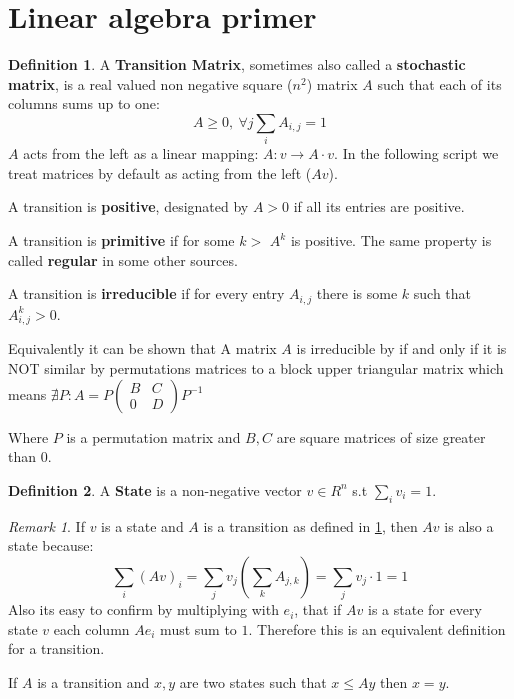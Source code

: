 \documentclass[a4paper,10pt]{article}
\theoremstyle{definition}
\newtheorem{mydef}{Definition}[section]
\theoremstyle{remark}
\newtheorem{remark}{Remark}
\theoremstyle{plain}
\begin{document}
\section{Linear algebra primer}

\begin{mydef}
\label{def:transition}
A \textbf{Transition Matrix}, sometimes also called
a \textbf{stochastic matrix}, is a real valued non negative square
($n^2$) matrix $A$ such that each of its
columns sums up to one: $$A \geq 0,\ \forall j \sum_i A_{i,j} = 1$$
$A$ acts from the left as a linear mapping:
$A:v \to A \cdot v$. In the following script we treat matrices by default
as acting from the left ($Av$). 

A transition is \textbf{positive}, designated by $A > 0$ if all its entries are positive.

A transition is \textbf{primitive} if for some $k>$ $A^k$ is positive. The same
property is called \textbf{regular} in some other sources.

A transition is \textbf{irreducible} if for every entry $A_{i,j}$ there is some $k$ such
that $A^k_{i,j} > 0$.

Equivalently it can be shown that 
A matrix $A$ is 
irreducible by if and only if it is NOT
similar by permutations matrices to a block upper triangular matrix
which means 
$
\nexists P : 
A =
P
\begin{pmatrix}
B & C \\
0 & D
\end{pmatrix}
P^{-1}
$

Where $P$ is a permutation matrix and $B, C$ are square matrices of size greater than $0$.
\end{mydef}

\begin{mydef}
\label{def:state}
A \textbf{State} is a non-negative vector $v \in R^n$ s.t $\sum_i v_i = 1$.
\end{mydef}

\begin{remark}
\label{remark:state}
If $v$ is a
state and $A$ is a transition as defined in
\ref{def:transition}, then
  $Av$ is also a state because: 
$$\sum_i(Av)_i = \sum_j v_j(\sum_k A_{j,k}) = \sum_j v_j \cdot 1 = 1$$
Also its easy to confirm by multiplying with $e_i$, that if $Av$ is a state
for every state $v$ 
each column $A e_i$ must sum to $1$.
Therefore this is an equivalent definition for a transition.

If $A$ is a transition and $x,y$ are two states such that
$x \leq Ay$ then $x=y$.
\end{remark}
\end{document}
